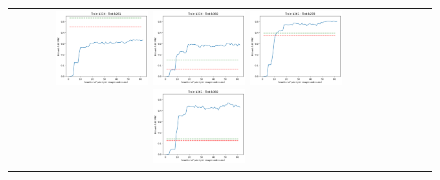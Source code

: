 \begin{figure}[h!]
\begin{tabular}{cccc}
  \includegraphics[width=0.25\textwidth]{Kap5/rbf_INDIVIDUAL_CURVES_train=b234test=b261.png}  
  \includegraphics[width=0.25\textwidth]{Kap5/rbf_INDIVIDUAL_CURVES_train=b234test=b360.png}
  \includegraphics[width=0.25\textwidth]{Kap5/rbf_INDIVIDUAL_CURVES_train=b261test=b278.png}  
  \includegraphics[width=0.25\textwidth]{Kap5/rbf_INDIVIDUAL_CURVES_train=b261test=b360.png} \\


\end{tabular}
\end{figure}
